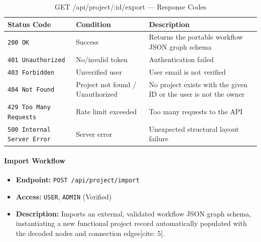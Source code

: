 \begin{table}[H]
\centering
\renewcommand{\arraystretch}{1.3}
\begin{tabularx}{\textwidth}{|l|l|X|}
\hline
\textbf{Status Code} & \textbf{Condition} & \textbf{Description} \\
\hline
\texttt{200 OK}           & Success              & Returns the portable workflow JSON graph schema \\
\hline
\texttt{401 Unauthorized} & No/invalid token     & Authentication failed \\
\hline
\texttt{403 Forbidden}    & Unverified user      & User email is not verified \\
\hline
\texttt{404 Not Found}    & Project not found / Unauthorized  & No project exists with the given ID or the user is not the owner \\
\hline
\texttt{429 Too Many Requests} & Rate limit exceeded & Too many requests to the API \\
\hline
\texttt{500 Internal Server Error} & Server error & Unexpected structural layout failure \\
\hline
\end{tabularx}
\caption{GET /api/project/:id/export — Response Codes}
\label{tab:export-workflow-responses}
\end{table}
\FloatBarrier

\paragraph{Import Workflow}
\label{subsubsec:import-workflow}

\begin{itemize}
  \item \textbf{Endpoint:} \texttt{POST /api/project/import}
  \item \textbf{Access:} \texttt{USER}, \texttt{ADMIN} (Verified)
  \item \textbf{Description:} Imports an external, validated workflow JSON graph schema, instantiating a new functional project record automatically populated with the decoded nodes and connection edges[cite: 5].
\end{itemize}

